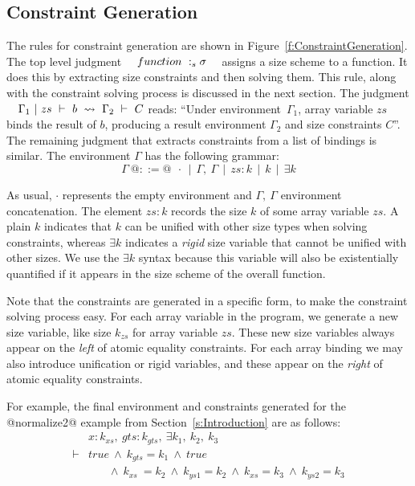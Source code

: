 \subsection{Constraint Generation}
The rules for constraint generation are shown in Figure~\ref{f:ConstraintGeneration}. The top level judgment ~~$function ~:_{s} \sigma$~~ assigns a size scheme to a function. It does this by extracting size constraints and then solving them. This rule, along with the constraint solving process is discussed in the next section. The judgment ~~$\Gamma_1 ~|~ zs ~\vdash~ b ~\leadsto~ \Gamma_2 ~\vdash~ C$ reads: ``Under environment~$\Gamma_1$, array variable $zs$ binds the result of $b$, producing a result environment $\Gamma_2$ and size constraints $C$''. The remaining judgment that extracts constraints from a list of bindings is similar. The environment $\Gamma$ has the following grammar:
$$
\Gamma~ @::=@ ~~\cdot ~~|~~ \Gamma,~ \Gamma ~~|~~ zs : k ~~|~~ k ~~|~~ \exists k
$$

As usual, $\cdot$ represents the empty environment and  $\Gamma,~ \Gamma$
environment concatenation. The element $zs : k$ records the size $k$ of some
array variable $zs$. A plain $k$ indicates that $k$ can be unified with other
size types when solving constraints, whereas $\exists k$ indicates a  \emph{rigid} size variable that cannot be unified with other sizes. We use the $\exists k$ syntax because this variable will also be existentially quantified if it appears in the size scheme of the overall function.

Note that the constraints are generated in a specific form, to make the constraint solving process easy. For each array variable in the program, we generate a new size variable, like size $k_{zs}$ for array variable $zs$. These new size variables always appear on the \emph{left} of atomic equality constraints. For each array binding we may also introduce unification or rigid variables, and these appear on the \emph{right} of atomic equality constraints.

For example, the final environment and constraints generated for the @normalize2@ example from Section~\ref{s:Introduction} are as follows:
$$
\begin{array}{ll}
       & x : k_{xs},~ gts : k_{gts},~ \exists k_1,~ k_2,~ k_3 
\\
\vdash & true 
        ~\wedge~  k_{gts} = k_1
        ~\wedge~  true
\\     &~~~~~~~~ 
          \wedge~  k_{xs}  ~= k_2
        ~ \wedge~  k_{ys1}  = k_2 
        ~ \wedge~  k_{xs}   = k_3
        ~ \wedge~  k_{ys2}  = k_3
\end{array}
$$


